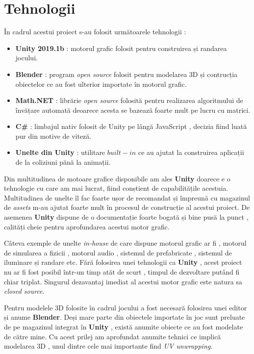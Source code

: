\chapter{Tehnologii}

În cadrul acestui proiect s-au folosit următoarele tehnologii :
\begin{itemize}
\item \textbf{Unity 2019.1b} : motorul grafic folosit pentru construirea și randarea jocului.
\item \textbf{Blender} : program \textit{open source} folosit pentru modelarea 3D și contrucția obiectelor ce au fost ulterior importate în motorul grafic.
\item \textbf{Math.NET} : librărie \textit{open source} folosită pentru realizarea algoritmului de învățare automată deoarece acesta se bazează foarte mult pe lucru cu matrici.
\item \textbf{C\#} : limbajul nativ folosit de Unity pe lângă JavaScript , decizia fiind luată pur din motive de viteză.
\item \textbf{Unelte din Unity} : utilitare $built-in$ ce au ajutat la construirea aplicații de la coliziuni pănă la animații.
\end{itemize}

Din multitudinea de motoare grafice disponibile am ales \textbf{Unity} doarece e o tehnologie cu care am mai lucrat, fiind conștient de capabilitățile acestuia. Multitudinea de unelte îl fac foarte ușor de recomandat și împreună cu magazinul de \textit{assets} m-au ajutat foarte mult în procesul de construcție al acestui proiect. De asemenea \textbf{Unity} dispune de o documentație foarte bogată și bine pusă la punct , calități cheie pentru aprofundarea acestui motor grafic.\par

Câteva exemple de unelte \textit{in-house} de care dispune motorul grafic ar fi , motorul de simularea a fizicii , motorul audio , sistemul de prefabricate , sistemul de iluminare și randare etc. Fără folosirea unei tehnologii ca \textbf{Unity} , acest proiect nu ar fi fost posibil într-un timp atăt de scurt , timpul de dezvoltare putând fi chiar triplat. Singurul dezavantaj imediat al acestui motor grafic este natura sa \textit{closed source}.\par

Pentru modelele 3D folosite în cadrul jocului a fost necesară folosirea unei editor și anume \textbf{Blender}. Deși mare parte din obiectele importate în joc sunt preluate de pe magazinul integrat în \textbf{Unity} , există anumite obiecte ce au fost modelate de către mine. Cu acest prilej am aprofundat anumite tehnici ce implică modelarea 3D , unul dintre cele mai importante find \textit {UV unwrapping}.\par

